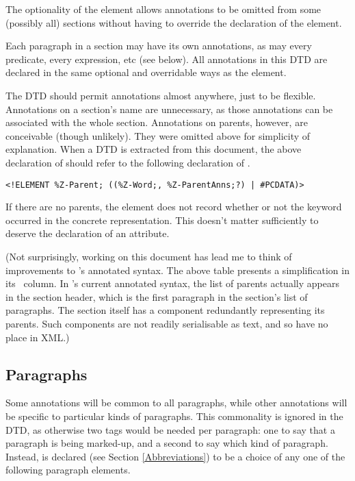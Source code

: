 \documentclass[a4paper,10pt]{article}
\begin{document}
The optionality of the  element
allows annotations to be omitted from some (possibly all) sections
without having to override the declaration of the  element.

Each paragraph in a section may have its own annotations,
as may every predicate, every expression, etc (see below).
All annotations in this DTD are declared in the same optional and overridable
ways as the  element.

The DTD should permit annotations almost anywhere, just to be flexible.
Annotations on a section's name are unnecessary,
as those annotations can be associated with the whole section.
Annotations on parents, however, are conceivable (though unlikely).
They were omitted above for simplicity of explanation.
When a DTD is extracted from this document,
the above declaration of  should refer to the following
declaration of .
\begin{verbatim}
<!ELEMENT %Z-Parent; ((%Z-Word;, %Z-ParentAnns;?) | #PCDATA)>
\end{verbatim}

If there are no parents,
the  element does not record whether or not
the keyword  occurred in the concrete representation.
This doesn't matter sufficiently to deserve the declaration of an attribute.

(Not surprisingly, working on this document has lead me
to think of improvements to \CADiZ's annotated syntax.
The above table presents a simplification in its \CADiZ\ column.
In \CADiZ's current annotated syntax,
the list of parents actually appears in the section header,
which is the first paragraph in the section's list of paragraphs.
The section itself has a \AFont{[doc]} component
redundantly representing its parents.
Such components are not readily serialisable as text,
and so have no place in XML.)

\subsection{Paragraphs}

Some annotations will be common to all paragraphs,
while other annotations will be specific to particular kinds of paragraphs.
This commonality is ignored in the DTD,
as otherwise two tags would be needed per paragraph:
one to say that a paragraph is being marked-up,
and a second to say which kind of paragraph.
Instead,  is declared (see Section \ref{Abbreviations})
to be a choice of any one of the following paragraph elements.
\end{document}
